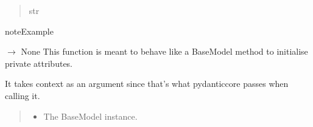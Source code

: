 \documentclass[letterpaper,10pt,english]{sphinxmanual}
\begin{document}
\begin{fulllineitems}
\begin{fulllineitems}
\begin{quote}
\begin{description}
\sphinxAtStartPar
str

\end{description}\end{quote}

\begin{sphinxadmonition}{note}{Example}

\begin{sphinxVerbatim}[commandchars=\\\{\}]
   
   \PYG{p}{[}\PYG{p}{]}
\end{sphinxVerbatim}
\end{sphinxadmonition}

\end{fulllineitems}


\begin{fulllineitems}
\label{\detokenize{src.esg_reports:src.esg_reports.validate.SearchResultValidator.model_post_init}}
\pysigstartsignatures
\pysiglinewithargsret
{}
{\sphinxparamcomma {}}
{{ $\rightarrow$ None}}
\pysigstopsignatures
\sphinxAtStartPar
This function is meant to behave like a BaseModel method to initialise private attributes.

\sphinxAtStartPar
It takes context as an argument since that’s what pydantic\sphinxhyphen{}core passes when calling it.
\begin{quote}\begin{description}
\begin{itemize}
\item {} 
\sphinxAtStartPar
{} \textendash{} The BaseModel instance.


\end{itemize}
\end{description}
\end{quote}
\end{fulllineitems}
\end{fulllineitems}
\end{document}
